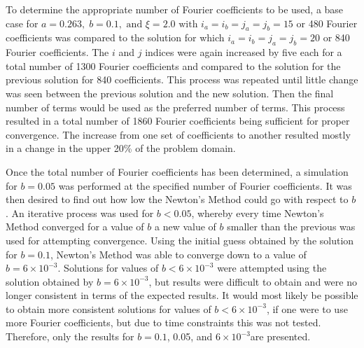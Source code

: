 \documentclass{article}
\newcommand{\spbox}[1]{ \text{ #1 }} %
\begin{document}
To determine the appropriate number of Fourier coefficients to be used, a base
case for $a=0.263, \; b=0.1,\spbox{and} \xi =2.0\spbox{with} i_{a} =i_{b}
=j_{a} =j_{b} =15$ or 480 Fourier coefficients was compared to the solution for
which $i_{a} =i_{b} =j_{a} =j_{b} =20$ or 840 Fourier coefficients. The $i$ and
$j$ indices were again increased by five each for a total number of 1300 Fourier
coefficients and compared to the solution for the previous solution for 840
coefficients. This process was repeated until little change was seen between the
previous solution and the new solution. Then the final number of terms would be
used as the preferred number of terms. This process resulted in a total number
of 1860 Fourier coefficients being sufficient for proper convergence. The
increase from one set of coefficients to another resulted mostly in a change in
the upper 20\% of the problem domain.

Once the total number of Fourier coefficients has been determined, a simulation
for $b=0.05$ was performed at the specified number of Fourier coefficients. It
was then desired to find out how low the Newton's Method could go with respect
to $b$. An iterative process was used for $b<0.05$, whereby every time Newton's
Method converged for a value of $b$ a new value of $b$ smaller than the previous
was used for attempting convergence. Using the initial guess obtained by the
solution for $b=0.1$, Newton's Method was able to converge down to a value of
$b=6\times 10^{-3} $. Solutions for values of $b<6\times 10^{-3} $ were
attempted using the solution obtained by $b=6\times 10^{-3} $, but results were
difficult to obtain and were no longer consistent in terms of the expected
results. It would most likely be possible to obtain more consistent solutions
for values of $b<6\times 10^{-3} $, if one were to use more Fourier
coefficients, but due to time constraints this was not tested. Therefore, only
the results for $b=0.1$, 0.05, and $6\times 10^{-3} $are presented.
\end{document}
